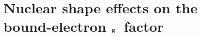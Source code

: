 \chapter{Nuclear shape effects on the bound-electron $\bf{g}$~factor}
\label{ch:nucl_def}










